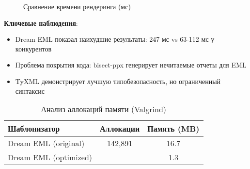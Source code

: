 \begin{figure}[h]
    \centering
    \caption{Сравнение времени рендеринга (мс)}
    \end{figure}
    
    \textbf{Ключевые наблюдения}:
    \begin{itemize}
        \item Dream EML показал наихудшие результаты: 247 мс vs 63-112 мс у конкурентов
        \item Проблема покрытия кода: bisect-ppx генерирует нечитаемые отчеты для EML
        \item TyXML демонстрирует лучшую типобезопасность, но ограниченный синтаксис
    \end{itemize}
    
    \begin{table}[h]
    \centering
    \caption{Анализ аллокаций памяти (Valgrind)}
    \begin{tabular}{|l|c|c|}
    \hline
    \textbf{Шаблонизатор} & \textbf{Аллокации} & \textbf{Память (MB)} \\
    \hline
    Dream EML (original) & 142,891 & 16.7 \\
    Dream EML (optimized) & \color{red}{512} & 1.3 \\
    \hline
    \end{tabular}
    \end{table}